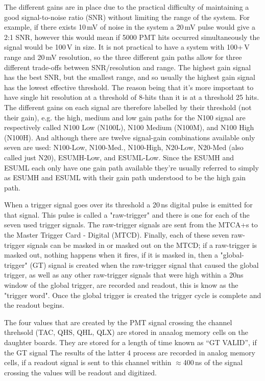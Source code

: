 The different gains are in place due to the practical difficulty of maintaining
a good signal-to-noise ratio (SNR) without limiting the range of the
system.
For example, if there exists 10\,mV of noise in the system a 20\,mV pulse
would give a 2:1 SNR, however this would mean if 5000 PMT hits occurred simultaneously
the signal would be 100\,V in size.
It is not practical to have a system with 100+\,V range and 20\,mV resolution,
so the three different gain paths allow for three different trade-offs between
SNR/resolution and range.
The highest gain signal has the best SNR, but the smallest range, and so usually
the highest gain signal has the lowest effective threshold.
The reason being that it's more important to have single hit resolution at a threshold
of 8-hits than it is at a threshold 25 hits.
The different gains on each signal are therefore labelled by their threshold (not their gain), e.g.
the high, medium and low gain paths for the N100 signal are respectively called
N100 Low (N100L), N100 Medium (N100M), and N100 High (N100H).
And although there are twelve signal-gain combinations available only seven are
used: N100-Low, N100-Med., N100-High, N20-Low, N20-Med (also called just N20), ESUMH-Low, and ESUML-Low.
Since the ESUMH and ESUML each only have one gain path available they're usually
referred to simply as ESUMH and ESUML with their gain path understood to be
the high gain path.

When a trigger signal goes over its threshold a 20\,ns digital pulse is
emitted for that signal. This pulse is called a "raw-trigger" and there is
one for each of the seven used trigger signals.
The raw-trigger signals are sent from the MTCA+s to the Master Trigger
Card - Digital (MTCD).
Finally, each of these seven raw-trigger signals can be masked in or masked out on
the MTCD;
if a raw-trigger is masked out, nothing happens when it fires,
if it is masked in, then a "global-trigger" (GT) signal is created when
the raw-trigger signal that caused the global trigger, as well as any other
raw-trigger signals that were high within a 20ns window of the global trigger,
are recorded and readout, this is know as the "trigger word".
Once the global trigger is created the trigger cycle is complete and
the readout begins.

The four values that are created by the PMT signal crossing
the channel threhsold (TAC, QHS, QHL, QLX) are stored in anaalog memory
cells on the daughter boards.
They are stored for a length of time known as ``GT VALID'', if
the GT signal 
The results of the latter 4 process are recorded in analog memory cells,
if a readout signal is sent to this channel within $\approx$400\,ns of the
signal crossing the values will be readout and digitized.

